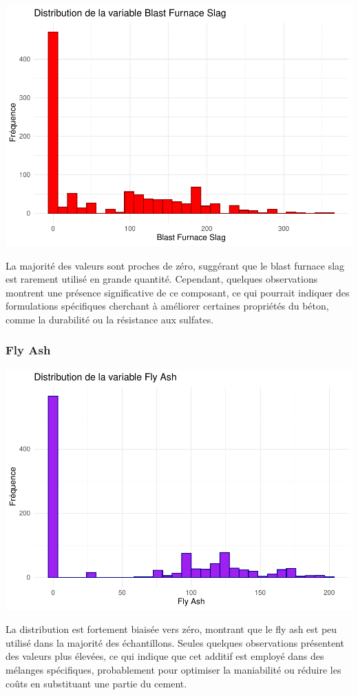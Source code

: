 \documentclass[
  12pt,
]{article}
\begin{document}
\includegraphics{rmd_final_files/figure-latex/unnamed-chunk-2-1.pdf}

La majorité des valeurs sont proches de zéro, suggérant que le blast
furnace slag est rarement utilisé en grande quantité. Cependant,
quelques observations montrent une présence significative de ce
composant, ce qui pourrait indiquer des formulations spécifiques
cherchant à améliorer certaines propriétés du béton, comme la durabilité
ou la résistance aux sulfates.

\subsubsection{Fly Ash}\label{fly-ash}

\includegraphics{rmd_final_files/figure-latex/unnamed-chunk-3-1.pdf}

La distribution est fortement biaisée vers zéro, montrant que le fly ash
est peu utilisé dans la majorité des échantillons. Seules quelques
observations présentent des valeurs plus élevées, ce qui indique que cet
additif est employé dans des mélanges spécifiques, probablement pour
optimiser la maniabilité ou réduire les coûts en substituant une partie
du cement.
\end{document}
